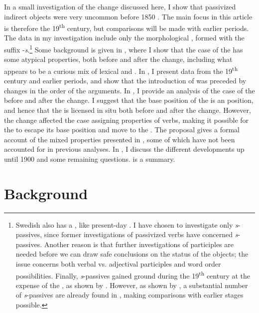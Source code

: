 \documentclass[output=paper]{langscibook}
\begin{document}
In a small investigation of the change discussed here, I show that passivized indirect objects were very uncommon before 1850 \citep[167]{Falk1997}. The main focus in this article is therefore the 19\textsuperscript{th} century, but comparisons will be made with earlier periods. The data in my investigation include only the morphological , formed with the suffix -\textit{s}.\footnote{Swedish also has a , like present-day . I have chosen to investigate only \textit{s}{}-passives, since former investigations of passivized  verbs have concerned \textit{s}{}-passives. Another reason is that further investigations of participles are needed before we can draw safe conclusions on the status of the objects; the issue concerns both verbal vs. adjectival participles and word order possibilities. Finally, \textit{s}{}-passives gained ground during the 19\textsuperscript{th} century at the expense of the , as shown by \citet{Kirri1975}. However, as shown by \citet{Holm1952}, a substantial number of \textit{s}{}-passives are already found in , making comparisons with earlier stages possible.} Some background is given in , where I show that the case of the  has some atypical properties, both before and after the change, including what appears to be a curious mix of lexical and . In , I present data from the 19\textsuperscript{th} century and earlier periods, and show that the introduction of  was preceded by changes in the order of the arguments. In , I provide an analysis of the case of the  before and after the change. I suggest that the base position of the  is an  position, and hence that the  is licensed in situ both before and after the change. However, the change affected the case assigning properties of  verbs, making it possible for the  to escape its base position and move to the . The proposal gives a formal account of the mixed properties presented in , some of which have not been accounted for in previous analyses. In , I discuss the different developments up until 1900 and some remaining questions.  is a summary.

\section{Background}\label{sec:falk:2}
\end{document}
